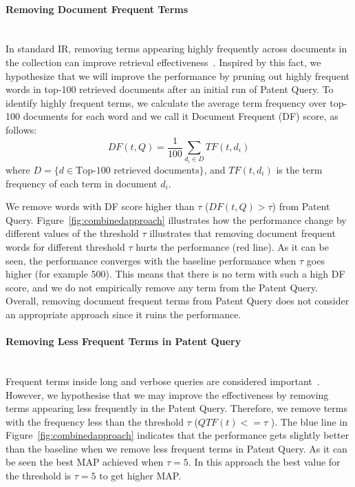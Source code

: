 \paragraph{Removing Document Frequent Terms}
\ \\
In standard IR, removing terms appearing highly frequently across documents in the collection can improve retrieval effectiveness~\citep{manning2008introduction}. Inspired by this fact, we hypothesize that we will improve the performance by pruning out highly frequent words in top-100 retrieved documents after an initial run of Patent Query. To identify highly frequent terms, we calculate the average term frequency over top-100 documents for each word and we call it Document Frequent (DF) score, as follows:
\begin{equation}
 DF(t, Q)=\frac{1}{100}\sum_{d_i\in  D} TF(t, d_i)    
 \label{eq:df}
\end{equation}
where $D=\{d\in \mbox{Top-100 retrieved documents}\}$, and $TF(t, d_i)$ is the term frequency of each term in document $d_i$.

We remove words with DF score higher than $\tau$ ($DF(t, Q)>\tau$) from Patent Query. Figure~\ref{fig:combinedapproach} illustrates how the performance change by different values of the threshold $\tau$ illustrates that removing document frequent words for different threshold $\tau$ hurts the performance (red line). As it can be seen, the performance converges with the baseline performance when $\tau$ goes higher (for example 500). This means that there is no term with such a high DF score, and we do not empirically remove any term from the Patent Query. Overall, removing document frequent terms from Patent Query does not consider an appropriate approach since it ruins the performance. 
\paragraph{Removing Less Frequent Terms in Patent Query}
\ \\
Frequent terms inside long and verbose queries are considered important~\citep{maxwell2013compact}. However, we hypothesise that we may improve the effectiveness by removing terms appearing less frequently in the Patent Query. Therefore, we remove terms with the frequency less than the threshold $\tau$ ($QTF(t)<=\tau$ ). The blue line in Figure~\ref{fig:combinedapproach} indicates that the performance gets slightly better than the baseline when we remove less frequent terms in Patent Query. As it can be seen the best MAP achieved when $\tau=5$. 
In this approach the best value for the threshold is $\tau=5$ to get higher MAP.
